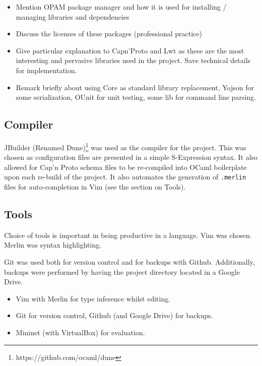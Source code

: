 \begin{itemize}
  \item Mention OPAM package manager and how it is used for installing / managing libraries and dependencies
  \item Discuss the licenses of these packages (professional practice)
  \item Give particular explanation to Capn'Proto and Lwt as these are the most interesting and pervasive libraries used in the project. Save technical details for implementation.
  \item Remark briefly about using Core as standard library replacement, Yojson for some serialization, OUnit for unit testing, some lib for command line parsing.
\end{itemize}

\subsection{Compiler}
JBuilder {\color{red}(Renamed Dune)}\footnote{https://github.com/ocaml/dune} was used as the compiler for the project. This was chosen as configuration files are presented in a simple S-Expression syntax. It also allowed for Cap'n Proto schema files to be re-compiled into OCaml boilerplate upon each re-build of the project. It also automates the generation of \texttt{.merlin} files for auto-completion in Vim (see the section on Tools).

\subsection{Tools}

Choice of tools is important in being productive in a language. Vim was chosen. Merlin was syntax highlighting. 

Git was used both for version control and for backups with Github. Additionally, backups were performed by having the project directory located in a Google Drive. 

\begin{itemize}
  \item Vim with Merlin for type inference whilst editing.
  \item Git for version control, Github (and Google Drive) for backups.
  \item Mininet (with VirtualBox) for evaluation.
\end{itemize}


